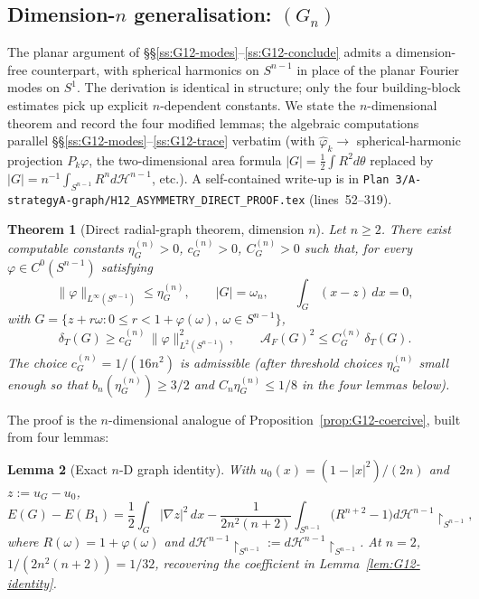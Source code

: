 \documentclass[11pt]{amsart}
\newtheorem{theorem}{Theorem}[section]
\newtheorem{lemma}[theorem]{Lemma}
\newcommand{\dT}{\delta_T}
\newcommand{\AF}{\mathcal A_F}
\newcommand{\HH}{\mathcal H}
\newcommand{\dHnm}{d\mathcal H^{n-1}\!\restriction_{S^{n-1}}}
\begin{document}
\subsection{Dimension-\texorpdfstring{$n$}{n} generalisation:
\texorpdfstring{$(G_n)$}{(G\_n)}}\label{ss:Gn}

The planar argument of \S\S\ref{ss:G12-modes}--\ref{ss:G12-conclude}
admits a dimension-free counterpart, with spherical harmonics on
$S^{n-1}$ in place of the planar Fourier modes on $S^1$.  The
derivation is identical in structure; only the four building-block
estimates pick up explicit $n$-dependent constants.  We state the
$n$-dimensional theorem and record the four modified lemmas; the
algebraic computations parallel
\S\S\ref{ss:G12-modes}--\ref{ss:G12-trace} verbatim (with
$\hat\varphi_k\to$ spherical-harmonic projection $P_k\varphi$, the
two-dimensional area formula $|G|=\tfrac12\int R^2 d\theta$ replaced
by $|G|=n^{-1}\int_{S^{n-1}}R^n d\HH^{n-1}$, etc.).  A self-contained
write-up is in
\texttt{Plan~3/A-strategyA-graph/H12\_ASYMMETRY\_DIRECT\_PROOF.tex}
\textup{(}lines~52--319\textup{)}.

\begin{theorem}[Direct radial-graph theorem, dimension $n$]
\label{thm:Gn}
Let $n\ge 2$.  There exist computable constants $\eta_G^{(n)}>0$,
$c_G^{(n)}>0$, $C_G^{(n)}>0$ such that, for every $\varphi\in
C^0(S^{n-1})$ satisfying
\begin{equation}\label{eq:Gn-hyp}
   \|\varphi\|_{L^\infty(S^{n-1})}\le\eta_G^{(n)},
   \qquad
   |G|=\omega_n,
   \qquad
   \int_G(x-z)\,dx=0,
\end{equation}
with
$G=\{z+r\omega:0\le r<1+\varphi(\omega),\ \omega\in S^{n-1}\}$,
\begin{equation}\label{eq:Gn-coerc}
   \dT(G)\ge c_G^{(n)}\,\|\varphi\|_{L^2(S^{n-1})}^{2},
   \qquad
   \AF(G)^{2}\le C_G^{(n)}\,\dT(G).
\end{equation}
The choice $c_G^{(n)}=1/(16 n^{2})$ is admissible (after threshold
choices $\eta_G^{(n)}$ small enough so that $b_n(\eta_G^{(n)})\ge
3/2$ and $C_n\eta_G^{(n)}\le 1/8$ in the four lemmas below).
\end{theorem}

The proof is the $n$-dimensional analogue of
Proposition~\ref{prop:G12-coercive}, built from four lemmas:

\begin{lemma}[Exact $n$-D graph identity]\label{lem:Gn-identity}
With $u_0(x)=(1-|x|^2)/(2n)$ and $z:=u_G-u_0$,
\begin{equation}\label{eq:Gn-identity}
   E(G)-E(B_1)
   =\frac12\int_G|\nabla z|^{2}\,dx
     -\frac{1}{2n^{2}(n+2)}
       \int_{S^{n-1}}\bigl(R^{n+2}-1\bigr)\dHnm,
\end{equation}
where $R(\omega)=1+\varphi(\omega)$ and
$\dHnm:=d\HH^{n-1}\!\restriction_{S^{n-1}}$.  At $n=2$,
$1/(2n^{2}(n+2))=1/32$, recovering the coefficient in
Lemma~\ref{lem:G12-identity}.
\end{lemma}
\end{document}
